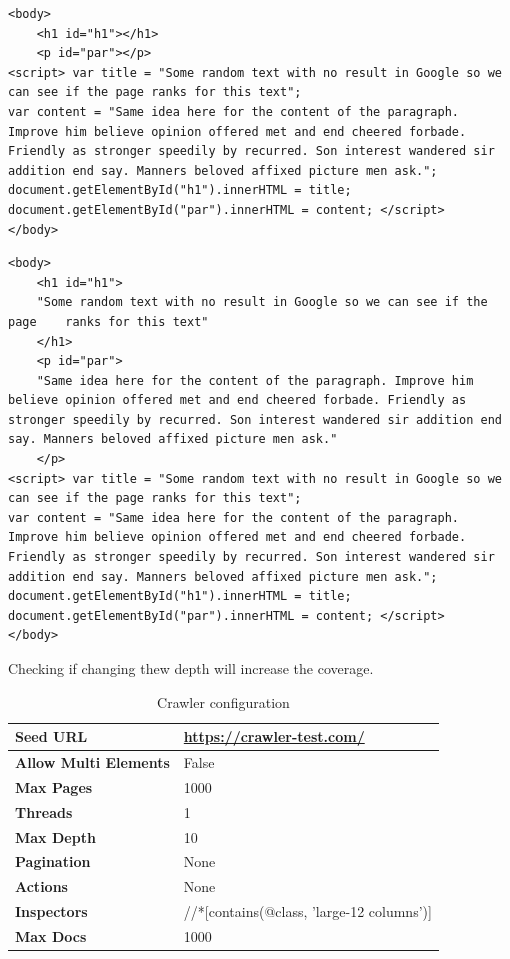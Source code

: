 {\begin{lstlisting}
<body>
	<h1 id="h1"></h1> 
	<p id="par"></p>
<script> var title = "Some random text with no result in Google so we can see if the page ranks for this text";
var content = "Same idea here for the content of the paragraph. Improve him believe opinion offered met and end cheered forbade. Friendly as stronger speedily by recurred. Son interest wandered sir addition end say. Manners beloved affixed picture men ask."; 
document.getElementById("h1").innerHTML = title; 
document.getElementById("par").innerHTML = content; </script>
</body>
\end{lstlisting}

\begin{lstlisting}
<body>
	<h1 id="h1">
	"Some random text with no result in Google so we can see if the page 	ranks for this text"
	</h1> 
	<p id="par">
	"Same idea here for the content of the paragraph. Improve him believe opinion offered met and end cheered forbade. Friendly as stronger speedily by recurred. Son interest wandered sir addition end say. Manners beloved affixed picture men ask."
	</p>
<script> var title = "Some random text with no result in Google so we can see if the page ranks for this text";
var content = "Same idea here for the content of the paragraph. Improve him believe opinion offered met and end cheered forbade. Friendly as stronger speedily by recurred. Son interest wandered sir addition end say. Manners beloved affixed picture men ask."; 
document.getElementById("h1").innerHTML = title; 
document.getElementById("par").innerHTML = content; </script>
</body>
\end{lstlisting}

Checking if changing thew depth will increase the coverage.


\begin{table}[ht] 
{\footnotesize
\begin{tabular}{ P{3cm} ||P{10.1cm}  }      %
 \hline \hline
\textbf{Seed URL} & \href{https://crawler-test.com/}{https://crawler-test.com/}\T\B 
\\ 
\hline
\textbf{Allow Multi Elements} & False \T\B 
\\ 
\hline
\textbf{Max Pages} & 1000\T\B 
\\ 
\hline
\textbf{Threads} & 1\T\B 
\\ 
\hline
\textbf{Max Depth} & 10\T\B 
\\ 
\hline
\textbf{Pagination} & None\T\B 
\\ 
\hline
\textbf{Actions} & None\T\B 
\\ 
\hline
\textbf{Inspectors} & //*[contains(@class, 'large-12 columns')]\T\B 
\\ 
\hline
\textbf{Max Docs} & 1000\T\B 
\\ 
\hline \hline
    \end{tabular}
}
  \captionsetup{justification=centering,margin=2cm}
  \caption{Crawler configuration}
\end{table}



}
